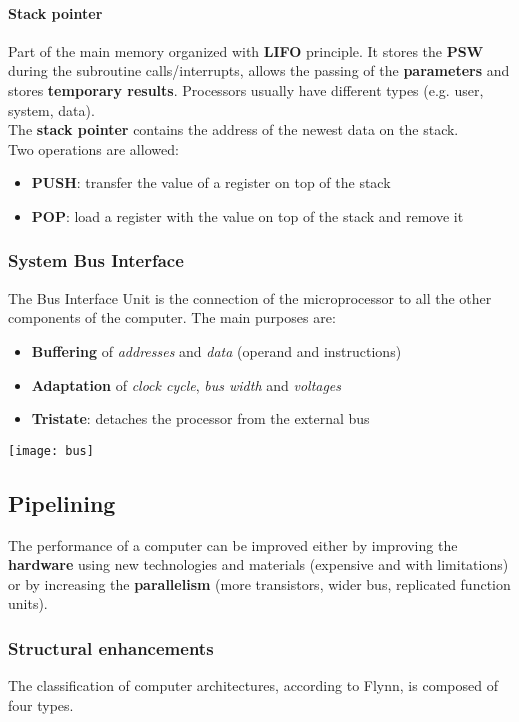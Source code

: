 \paragraph{Stack pointer}
Part of the main memory organized with \textbf{LIFO} principle. It stores the \textbf{PSW} during the subroutine calls/interrupts, allows the passing of the \textbf{parameters} and stores \textbf{temporary results}. Processors usually have different types (e.g. user, system, data).\\
The \textbf{stack pointer} contains the address of the newest data on the stack.\\
Two operations are allowed:
\begin{itemize}
	\item \textbf{PUSH}: transfer the value of a register on top of the stack
	\item \textbf{POP}: load a register with the value on top of the stack and remove it
\end{itemize}

\subsubsection{System Bus Interface}
The Bus Interface Unit is the connection of the microprocessor to all the other components of the computer. The main purposes are:
\begin{itemize}
	\item \textbf{Buffering} of \textit{addresses} and \textit{data} (operand and instructions)
	\item \textbf{Adaptation} of \textit{clock cycle}, \textit{bus width} and \textit{voltages}
	\item \textbf{Tristate}: detaches the processor from the external bus
\end{itemize}
\begin{center}
	\texttt{[image: bus]}
\end{center}

\subsection{Pipelining}
The performance of a computer can be improved either by improving the \textbf{hardware} using new technologies and materials (expensive and with limitations) or by increasing the \textbf{parallelism} (more transistors, wider bus, replicated function units).

\subsubsection{Structural enhancements}
The classification of computer architectures, according to Flynn, is composed of four types.
